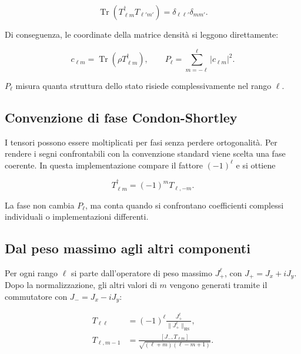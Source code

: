 \documentclass[10pt,a4paper]{article}
\newcommand{\HS}{\mathrm{HS}}
\begin{document}
\begin{equationbox}
\[
  \operatorname{Tr}\!\left(
    T_{\ell m}^{\dagger}T_{\ell' m'}
  \right)
  =\delta_{\ell\ell'}\delta_{mm'}.
\]
\end{equationbox}

Di conseguenza, le coordinate della matrice densit\`a si leggono direttamente:

\begin{equationbox}
\[
  c_{\ell m}=\operatorname{Tr}(\rho T_{\ell m}^{\dagger}),
  \qquad
  P_{\ell}=\sum_{m=-\ell}^{\ell}|c_{\ell m}|^2.
\]
\end{equationbox}

$P_{\ell}$ misura quanta struttura dello stato risiede complessivamente nel
rango $\ell$.

\subsection{Convenzione di fase Condon-Shortley}

I tensori possono essere moltiplicati per fasi senza perdere ortogonalit\`a.
Per rendere i segni confrontabili con la convenzione standard viene scelta una
fase coerente. In questa implementazione compare il fattore $(-1)^{\ell}$ e si
ottiene

\begin{equationbox}
\[
  T_{\ell m}^{\dagger}=(-1)^mT_{\ell,-m}.
\]
\end{equationbox}

La fase non cambia $P_{\ell}$, ma conta quando si confrontano coefficienti
complessi individuali o implementazioni differenti.

\subsection{Dal peso massimo agli altri componenti}

Per ogni rango $\ell$ si parte dall'operatore di peso massimo
$J_+^{\ell}$, con $J_+=J_x+iJ_y$. Dopo la normalizzazione, gli altri valori di
$m$ vengono generati tramite il commutatore con $J_-=J_x-iJ_y$:

\begin{equationbox}
\begin{align*}
  T_{\ell\ell}
  &=(-1)^{\ell}
    \frac{J_+^{\ell}}{\lVert J_+^{\ell}\rVert_{\HS}},\\[2mm]
  T_{\ell,m-1}
  &=\frac{[J_-,T_{\ell m}]}
  {\sqrt{(\ell+m)(\ell-m+1)}}.
\end{align*}
\end{equationbox}
\end{document}
